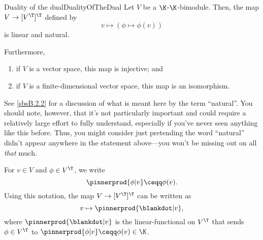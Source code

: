 \begin{thm}{Duality of the dual}{DualityOfTheDual}
	Let $V$ be a $\K$-$\K$-bimodule.  Then, the map $V\rightarrow [V^{\T}]^{\T}$ defined by
	\begin{equation}
	v\mapsto (\phi \mapsto \phi (v))
	\end{equation}
	is linear and natural.
	
	Furthermore,
	\begin{enumerate}
		\item \label{DualityOfTheDual(i)}if $V$ is a vector space, this map is injective; and
		\item \label{DualityOfTheDual(ii)}if $V$ is a finite-dimensional vector space, this map is an isomorphism.
	\end{enumerate}
	\begin{rmk}
		See \cref{sbsB.2.2} for a discussion of what is meant here by the term ``natural''.  You should note, however, that it's not particularly important and could require a relatively large effort to fully understand, especially if you've never seen anything like this before.  Thus, you might consider just pretending the word ``natural'' didn't appear anywhere in the statement above---you won't be missing out on all \emph{that} much.
	\end{rmk}
	\begin{rmk}
		For $v\in V$ and $\phi \in V^{\T}$, we write
		\begin{equation}
		\pinnerprod{\phi |v}\ceqq \phi (v).
		\end{equation}
		Using this notation, the map $V\rightarrow [V^{\T}]^{\T}$ can be written as
		\begin{equation}
		v\mapsto \pinnerprod{\blankdot |v},
		\end{equation}
		where $\pinnerprod{\blankdot |v}$ is the linear-functional on $V^{\T}$ that sends $\phi \in V^{\T}$ to $\pinnerprod{\phi |v}\ceqq \phi (v)\in \K$.
		

\end{rmk}
\end{thm}
